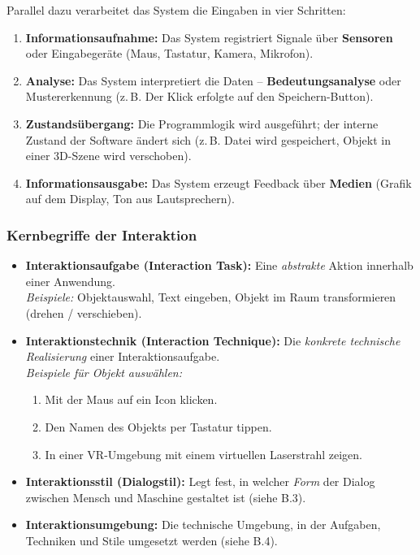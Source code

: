 \documentclass[12pt, a4paper]{article}
\begin{document}
Parallel dazu verarbeitet das System die Eingaben in vier Schritten:

\begin{enumerate}
  \item \textbf{Informationsaufnahme:} Das System registriert Signale über
        \textbf{Sensoren} oder Eingabegeräte (Maus, Tastatur, Kamera, Mikrofon).
  \item \textbf{Analyse:} Das System interpretiert die Daten -- \textbf{Bedeutungsanalyse}
        oder Mustererkennung (z.\,B. \glqq{}Der Klick erfolgte auf den Speichern-Button\grqq{}).
  \item \textbf{Zustandsübergang:} Die Programmlogik wird ausgeführt; der interne
        Zustand der Software ändert sich (z.\,B. Datei wird gespeichert, Objekt
        in einer 3D-Szene wird verschoben).
  \item \textbf{Informationsausgabe:} Das System erzeugt Feedback über \textbf{Medien}
        (Grafik auf dem Display, Ton aus Lautsprechern).
\end{enumerate}

\subsubsection{Kernbegriffe der Interaktion}

\begin{itemize}
  \item \textbf{Interaktionsaufgabe (Interaction Task):} Eine \textit{abstrakte}
        Aktion innerhalb einer Anwendung.\\
        \textit{Beispiele:} Objektauswahl, Text eingeben, Objekt im Raum transformieren
        (drehen / verschieben).

  \item \textbf{Interaktionstechnik (Interaction Technique):} Die \textit{konkrete
        technische Realisierung} einer Interaktionsaufgabe.\\
        \textit{Beispiele für \glqq{}Objekt auswählen\grqq{}:}
        \begin{enumerate}
          \item Mit der Maus auf ein Icon klicken.
          \item Den Namen des Objekts per Tastatur tippen.
          \item In einer VR-Umgebung mit einem \glqq{}virtuellen Laserstrahl\grqq{} zeigen.
        \end{enumerate}

  \item \textbf{Interaktionsstil (Dialogstil):} Legt fest, in welcher \textit{Form}
        der Dialog zwischen Mensch und Maschine gestaltet ist (siehe B.3).

  \item \textbf{Interaktionsumgebung:} Die technische Umgebung, in der Aufgaben,
        Techniken und Stile umgesetzt werden (siehe B.4).
\end{itemize}
\end{document}
